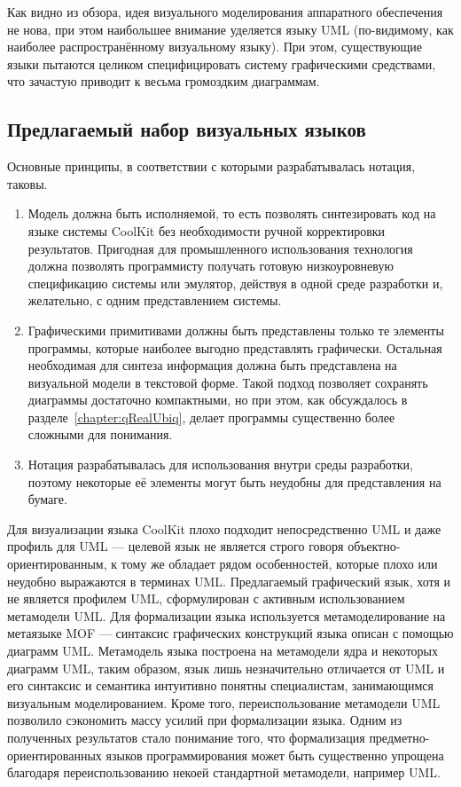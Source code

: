 Как видно из обзора, идея визуального моделирования аппаратного обеспечения не нова, 
при этом наибольшее внимание уделяется языку UML (по-видимому, как наиболее распространённому 
визуальному языку). При этом, существующие языки пытаются целиком специфицировать 
систему графическими средствами, что зачастую приводит к весьма громоздким диаграммам.

\subsection{Предлагаемый набор визуальных языков}
Основные принципы, в соответствии с которыми разрабатывалась нотация, таковы.
\begin{enumerate}
	\item Модель должна быть исполняемой, то есть позволять синтезировать код на языке 
		системы CoolKit без необходимости ручной корректировки результатов. Пригодная 
		для промышленного использования технология должна позволять программисту получать 
		готовую низкоуровневую спецификацию системы или эмулятор, действуя в одной среде 
		разработки и, желательно, с одним представлением системы.
	\item Графическими примитивами должны быть представлены только те элементы программы, 
		которые наиболее выгодно представлять графически. Остальная необходимая для синтеза 
		информация должна быть представлена на визуальной модели в текстовой форме. Такой 
		подход позволяет сохранять диаграммы достаточно компактными, но при этом, как 
		обсуждалось в разделе~\ref{chapter:qRealUbiq}, делает программы существенно более 
		сложными для понимания.
	\item Нотация разрабатывалась для использования внутри среды разработки, поэтому 
		некоторые её элементы могут быть неудобны для представления на бумаге.
\end{enumerate}

Для визуализации языка CoolKit плохо подходит непосредственно UML и даже профиль для 
UML --- целевой язык не является строго говоря объектно-ориентированным, к тому же 
обладает рядом особенностей, которые плохо или неудобно выражаются в терминах UML. 
Предлагаемый графический язык, хотя и не является профилем UML, сформулирован с активным 
использованием метамодели UML. Для формализации языка используется метамоделирование 
на метаязыке MOF --- синтаксис графических конструкций языка описан с помощью диаграмм UML. 
Метамодель языка построена на метамодели ядра и некоторых диаграмм UML, таким образом, 
язык лишь незначительно отличается от UML и его синтаксис и семантика интуитивно понятны 
специалистам, занимающимся визуальным моделированием. Кроме того, переиспользование 
метамодели UML позволило сэкономить массу усилий при формализации языка. Одним из 
полученных результатов стало понимание того, что формализация предметно-ориентированных 
языков программирования может быть существенно упрощена благодаря переиспользованию 
некоей стандартной метамодели, например UML.

